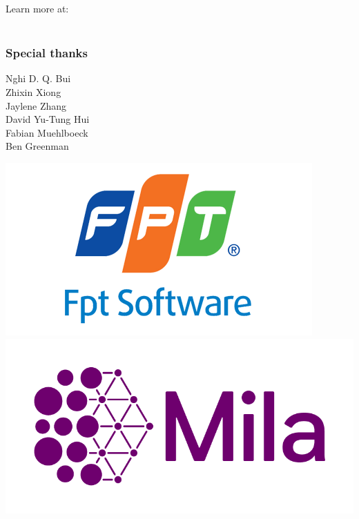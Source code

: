 \documentclass{beamer}
\begin{document}
\begin{frame}
\begin{frame}[fragile]
    \end{frame}

    \begin{frame}
        \begin{center}
            \Huge{Learn more at: \\~\\
            \href{http://array22.ndan.co}{\color{blue}{http://array22.ndan.co}}}
        \end{center}
    \end{frame}

    \begin{frame}
        \frametitle{Special thanks}
            \begin{center}
                \LARGE{
                    Nghi D. Q. Bui\\
                    Zhixin Xiong\\
                    Jaylene Zhang\\
                    David Yu-Tung Hui\\
                    Fabian Muehlboeck\\
                    Ben Greenman
                }

                \includegraphics[scale=0.3]{../figures/fpt_logo.png}
                \includegraphics[scale=0.2]{../figures/mila_logo.png}
            \end{center}
    \end{frame}
\end{document}
